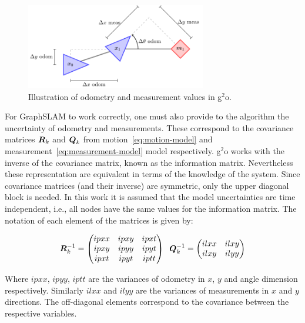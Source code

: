 \begin{figure}[htbp!]
    \centering
    \includegraphics[width=0.7\textwidth]{tikz/protocol.pdf}
    \caption{Illustration of odometry and measurement values in g$^2$o.}
    \label{fig:protocol}
\end{figure}

For GraphSLAM to work correctly, one must also provide to the algorithm the uncertainty of odometry and measurements. These correspond to the covariance matrices $\boldsymbol{R}_k$ and $\boldsymbol{Q}_k$ from motion~\eqref{eq:motion-model} and measurement~\eqref{eq:measurement-model} model respectively. g$^2$o works with the inverse of the covariance matrix, known as the information matrix. Nevertheless these representation are equivalent in terms of the knowledge of the system. Since covariance matrices (and their inverse) are symmetric, only the upper diagonal block is needed. In this work it is assumed that the model uncertainties are time independent, i.e., all nodes have the same values for the information matrix. The notation of each element of the matrices is given by:

\begin{equation}
    \boldsymbol{R}^{-1}_k = \begin{pmatrix}
    ipxx & ipxy & ipxt\\
    ipxy & ipyy & ipyt\\
    ipxt & ipyt & iptt
    \end{pmatrix} \;\;
    \boldsymbol{Q}^{-1}_k = \begin{pmatrix}
    ilxx & ilxy\\
    ilxy & ilyy
    \end{pmatrix} 
    \label{eq:info-matrices}
\end{equation}

\noindent
Where $ipxx$, $ipyy$, $iptt$ are the variances of odometry in $x$, $y$ and angle dimension respectively. Similarly $ilxx$ and $ilyy$ are the variances of measurements in $x$ and $y$ directions. The off-diagonal elements correspond to the covariance between the respective variables. 

